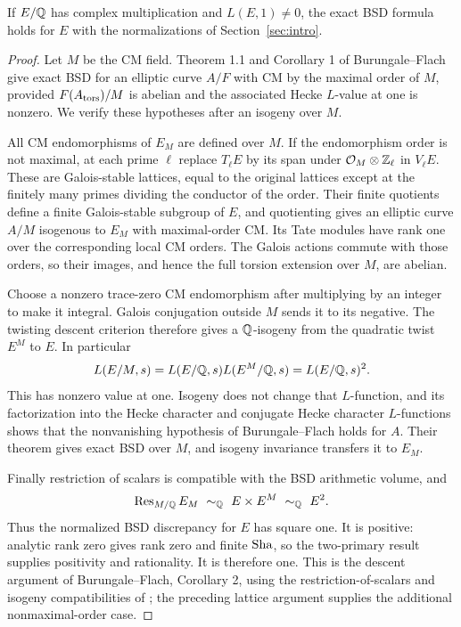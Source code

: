 \begin{lemma}\label{center:cm-zero}
If $E/\mathbb Q$ has complex multiplication and $L(E,1)\ne0$, the exact
BSD formula holds for $E$ with the normalizations of
Section~\ref{sec:intro}.
\end{lemma}

\begin{proof}
Let $M$ be the CM field.  Theorem 1.1 and Corollary 1 of
Burungale--Flach~\cite{BurungaleFlach} give exact BSD for an
elliptic curve $A/F$ with CM by the maximal order of $M$, provided
$F(A_{\rm tors})/M$ is abelian and the associated Hecke
$L$-value at one is nonzero.  We verify these hypotheses after an
isogeny over $M$.

All CM endomorphisms of $E_M$ are defined over $M$.  If the
endomorphism order is not maximal, at each prime $\ell$ replace
$T_\ell E$ by its span under $\mathcal O_M\otimes\mathbb Z_\ell$ in
$V_\ell E$.  These are Galois-stable lattices, equal to the
original lattices except at the finitely many primes dividing
the conductor of the order.  Their finite quotients define a
finite Galois-stable subgroup of $E$, and quotienting gives an
elliptic curve $A/M$ isogenous to $E_M$ with maximal-order CM.
Its Tate modules have rank one over the corresponding local CM
orders.  The Galois actions commute with those orders, so their
images, and hence the full torsion extension over $M$, are
abelian.

Choose a nonzero trace-zero CM endomorphism after multiplying
by an integer to make it integral.  Galois conjugation outside
$M$ sends it to its negative.  The twisting descent criterion
therefore gives a $\mathbb Q$-isogeny from the quadratic twist $E^M$ to
$E$.  In particular
\[
 L(E/M,s)=L(E/\mathbb Q,s)L(E^M/\mathbb Q,s)=L(E/\mathbb Q,s)^2.
\]
This has nonzero value at one.  Isogeny does not change that
$L$-function, and its factorization into the Hecke character
and conjugate Hecke character $L$-functions shows that the
nonvanishing hypothesis of Burungale--Flach holds for $A$.
Their theorem gives exact BSD over $M$, and isogeny invariance
transfers it to $E_M$.

Finally restriction of scalars is compatible with the BSD
arithmetic volume, and
\[
 \operatorname{Res}_{M/\Q}E_M\ \sim_{\Q}\ E\times E^M
 \ \sim_{\Q}\ E^2.
\]
Thus the normalized BSD discrepancy for $E$ has square one.
It is positive: analytic rank zero gives rank zero and finite
$\operatorname{Sha}$, so the two-primary result supplies positivity
and rationality.  It is therefore one.  This is the descent
argument of Burungale--Flach, Corollary 2, using the
restriction-of-scalars and isogeny compatibilities of
\cite{Cassels,MilneBSD}; the preceding lattice argument supplies
the additional nonmaximal-order case.
\end{proof}

